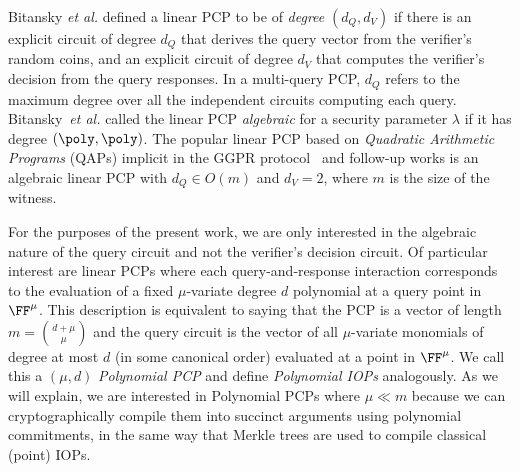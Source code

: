 Bitansky \emph{et al.} \cite{TCC:BCIOP13} defined a linear PCP to be of \emph{degree} $(d_Q, d_V)$ if there is an explicit circuit of degree $d_Q$ that derives the query vector from the verifier's random coins, and an explicit circuit of degree $d_V$ that computes the verifier's decision from the query responses. %
In a multi-query PCP, $d_Q$ refers to the maximum degree over all the independent circuits computing each query. Bitansky~\emph{et al.} called the linear PCP \emph{algebraic} for a security parameter $\lambda$ if it has degree $(\poly, \poly)$. The popular linear PCP based on \emph{Quadratic Arithmetic Programs} (QAPs) implicit in the GGPR protocol~\cite{EC:GGPR13} and follow-up works is an algebraic linear PCP with $d_Q \in O(m)$ and $d_V = 2$, where $m$ is the size of the witness.

For the purposes of the present work, we are only interested in the algebraic nature of the query circuit and not the verifier's decision circuit. Of particular interest are linear PCPs where each query-and-response interaction corresponds to the evaluation of a fixed $\mu$-variate degree $d$ polynomial at a query point in $\FF^\mu$. This description is equivalent to saying that the PCP is a vector of length $m = \binom{d +\mu}{\mu}$ and the query circuit is the vector of all $\mu$-variate monomials of degree at most $d$ (in some canonical order) evaluated at a point in $\FF^\mu$. We call this a $(\mu, d)$ \emph{Polynomial PCP} and define \emph{Polynomial IOPs} analogously. As we will explain, we are interested in Polynomial PCPs where $\mu \ll m$ because we can cryptographically compile them into succinct arguments using polynomial commitments, in the same way that Merkle trees are used to compile classical (point) IOPs. %

